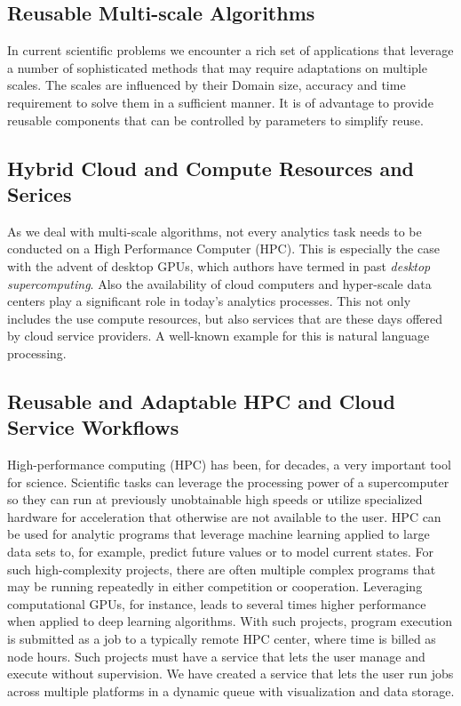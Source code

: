 \subsection{Reusable Multi-scale Algorithms}

In current scientific problems we encounter a rich set of applications
that leverage a number of sophisticated methods that may require
adaptations on multiple scales. The scales are influenced by their
Domain size, accuracy and time requirement to solve them in a
sufficient manner. It is of advantage to provide reusable components
that can be controlled by parameters to simplify reuse.

\subsection{Hybrid Cloud and Compute Resources and Serices}

As we deal with multi-scale algorithms, not every analytics task needs
to be conducted on a High Performance Computer (HPC). This is
especially the case with the advent of desktop GPUs, which authors
have termed in past {\em desktop supercomputing}. Also the
availability of cloud computers and hyper-scale data centers play a
significant role in today's analytics processes. This not only
includes the use compute resources, but also services that are these
days offered by cloud service providers. A well-known example for this
is natural language processing.

\subsection{Reusable and Adaptable HPC and Cloud Service Workflows}

High-performance computing (HPC) has been, for decades, a very important tool
for science. Scientific tasks can leverage the processing power of
a supercomputer so they can run at previously unobtainable high speeds
or utilize specialized hardware for acceleration that otherwise are not
available to the user. HPC can be used for analytic programs that
leverage machine learning applied to large data sets to, for example,
predict future values or to model current states. For such
high-complexity projects, there are often multiple complex programs that
may be running repeatedly in either competition or cooperation.
Leveraging computational GPUs, for instance, leads to several times higher
performance when applied to deep learning algorithms. With such
projects, program execution is submitted as a job to a typically remote
HPC center, where time is billed as node hours. Such projects must have
a service that lets the user manage and execute without supervision. We
have created a service that lets the user run jobs across multiple
platforms in a dynamic queue with visualization and data storage.

